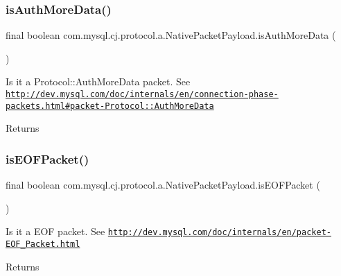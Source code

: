 \subsubsection{\texorpdfstring{is\+Auth\+More\+Data()}{isAuthMoreData()}}
{\footnotesize\ttfamily final boolean com.\+mysql.\+cj.\+protocol.\+a.\+Native\+Packet\+Payload.\+is\+Auth\+More\+Data (\begin{DoxyParamCaption}{ }\end{DoxyParamCaption})}

Is it a Protocol\+::\+Auth\+More\+Data packet. See \href{http://dev.mysql.com/doc/internals/en/connection-phase-packets.html#packet-Protocol::AuthMoreData}{\tt http\+://dev.\+mysql.\+com/doc/internals/en/connection-\/phase-\/packets.\+html\#packet-\/\+Protocol\+::\+Auth\+More\+Data}

\begin{DoxyReturn}{Returns}

\end{DoxyReturn}
\mbox{\label{classcom_1_1mysql_1_1cj_1_1protocol_1_1a_1_1_native_packet_payload_aebc952e2498deecf37b0b02c313b7bb8}} 
\subsubsection{\texorpdfstring{is\+E\+O\+F\+Packet()}{isEOFPacket()}}
{\footnotesize\ttfamily final boolean com.\+mysql.\+cj.\+protocol.\+a.\+Native\+Packet\+Payload.\+is\+E\+O\+F\+Packet (\begin{DoxyParamCaption}{ }\end{DoxyParamCaption})}

Is it a E\+OF packet. See \href{http://dev.mysql.com/doc/internals/en/packet-EOF_Packet.html}{\tt http\+://dev.\+mysql.\+com/doc/internals/en/packet-\/\+E\+O\+F\+\_\+\+Packet.\+html}

\begin{DoxyReturn}{Returns}

\end{DoxyReturn}
\mbox{\label{classcom_1_1mysql_1_1cj_1_1protocol_1_1a_1_1_native_packet_payload_a4367996e181d7956f2b586c27f1c04ee}} 
